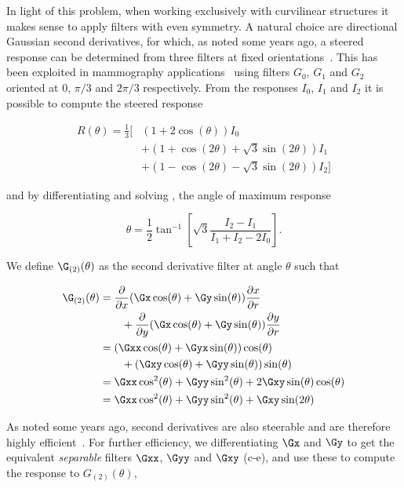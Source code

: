 In light of this problem, when working exclusively with curvilinear structures it makes sense to apply filters with even symmetry. A natural choice are directional Gaussian second derivatives, for which, as noted some years ago, a steered response can be determined from three filters at fixed orientations~\cite{Freeman_Adelson_TPAMI91,Koenderink_vanDoorn_TPAMI92}. This has been exploited in mammography applications~\cite{Karssemeijer_teBrake_TMI96} using filters $G_0$, $G_1$ and $G_2$ oriented at $0$, $\pi/3$ and $2\pi/3$ respectively. From the responses $I_0$, $I_1$ and $I_2$ it is possible to compute the steered response

\begin{align}
R(\theta) = \frac{1}{3}\Big[ %
    &  \left(1 + 2\cos(\theta) \right)I_0 \nonumber \\
    &+ \left(1 + \cos(2\theta) + \sqrt{3}\sin(2\theta)\right)I_1  \nonumber \\
    &+ \left(1 - \cos(2\theta) - \sqrt{3}\sin(2\theta)\right)I_2 \Big] \label{e:r2} %
\end{align}

\noindent and by differentiating and solving , the angle of maximum response

\begin{equation}
\theta = \frac{1}{2}\tan^{-1}\left[ \sqrt{3} \frac{I_2 - I_1}{I_1 + I_2 - 2I_0} \right].
\label{e:2d}
\end{equation}


We define $\G_{(2)}(\theta)$ as the second derivative filter at angle $\theta$ such that

\begin{align}
\G_{(2)}(\theta)
	&= 	\frac{\partial}{\partial x}(\Gx \cos(\theta) + \Gy \sin(\theta))\frac{\partial x}{\partial r} \notag\\
		&\qquad + \frac{\partial}{\partial y}(\Gx \cos(\theta) + \Gy \sin(\theta))\frac{\partial y}{\partial r} \\
%
	&= 	(\Gxx \cos(\theta) + \Gyx \sin(\theta))\cos(\theta) \notag\\
		&\qquad + (\Gxy \cos(\theta) + \Gyy \sin(\theta))\sin(\theta) \\
%
	&= 	\Gxx\cos^2(\theta) + \Gyy\sin^2(\theta) + 2\Gxy\sin(\theta)\cos(\theta) \\
%
	&=	\Gxx\cos^2(\theta) + \Gyy\sin^2(\theta) + \Gxy\sin(2\theta)
\label{e:ddG}
\end{align}

As noted some years ago, second derivatives are also steerable and are therefore highly efficient~\cite{Freeman_Adelson_TPAMI91,Koenderink_vanDoorn_TPAMI92}. For further efficiency, we differentiating $\Gx$ and $\Gy$ to get the equivalent \emph{separable} filters $\Gxx$, $\Gyy$ and $\Gxy$ (c-e), and use these to compute the response to $G_{(2)}(\theta)$,

